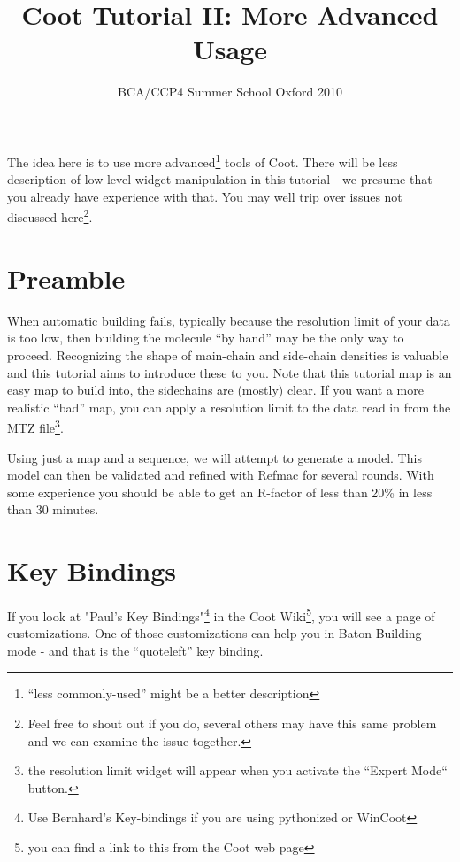 \documentclass{article}
\title{Coot Tutorial II: More Advanced Usage}
\author{BCA/CCP4 Summer School Oxford 2010}
\begin{document}
\maketitle


   


The idea here is to use more advanced\footnote{``less commonly-used''
  might be a better description} tools of Coot.  There will be less
description of low-level widget manipulation in this tutorial - we
presume that you already have experience with that.  You may well trip
over issues not discussed here\footnote{Feel free to shout out if you
  do, several others may have this same problem and we can examine the
  issue together.}.

\section{Preamble}

When automatic building fails, typically because the resolution limit
of your data is too low, then building the molecule ``by hand'' may be
the only way to proceed.  Recognizing the shape of main-chain and
side-chain densities is valuable and this tutorial aims to introduce
these to you.  Note that this tutorial map is an easy map to build
into, the sidechains are (mostly) clear.  If you want a more realistic
``bad'' map, you can apply a resolution limit to the data read in from
the MTZ file\footnote{the resolution limit widget will appear when you
  activate the ``Expert Mode`` button.}.

Using just a map and a sequence, we will attempt to generate a model.
This model can then be validated and refined with Refmac for several
rounds.  With some experience you should be able to get an R-factor of
less than 20\% in less than 30 minutes.


\section{Key Bindings}

If you look at "Paul's Key Bindings"\footnote{Use Bernhard's
  Key-bindings if you are using pythonized or WinCoot} in
the Coot Wiki\footnote{you can find a link to this from the Coot web
  page}, you will see a page of customizations.  One of those
customizations can help you in Baton-Building mode - and that is the
``quoteleft'' key binding.
\end{document}
